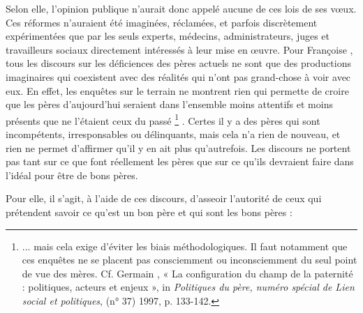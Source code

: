  Selon elle, l'opinion publique n'aurait donc appelé aucune de ces lois de ses vœux. Ces réformes n'auraient été imaginées, réclamées, et parfois discrètement expérimentées que par les seuls experts, médecins, administrateurs, juges et travailleurs sociaux directement intéressés à leur mise en œuvre. Pour Françoise , tous les discours sur les déficiences des pères actuels ne sont que des productions imaginaires qui coexistent avec des réalités qui n'ont pas grand-chose à voir avec eux. En effet, les enquêtes sur le terrain ne montrent rien qui permette de croire que les pères d'aujourd'hui seraient dans l'ensemble moins attentifs et moins présents que ne l'étaient ceux du passé%
\footnote{... mais cela exige d'éviter les biais méthodologiques. Il faut notamment que ces enquêtes ne se placent pas consciemment ou inconsciemment du seul point de vue des mères. Cf. Germain , « La configuration du champ de la paternité : politiques, acteurs et enjeux », in \emph{Politiques du père, numéro spécial de Lien social et politiques}, (n° 37) 1997, p. 133-142.}%
. Certes il y a des pères qui sont incompétents, irresponsables ou délinquants, mais cela n'a rien de nouveau, et rien ne permet d'affirmer qu'il y en ait plus qu'autrefois. Les discours ne portent pas tant sur ce que font réellement les pères que sur ce qu'ils devraient faire dans l'idéal pour être de bons pères. 

 Pour elle, il s'agit, à l'aide de ces discours, d'asseoir l'autorité de ceux qui prétendent savoir ce qu'est un bon père et qui sont les bons pères :
 
